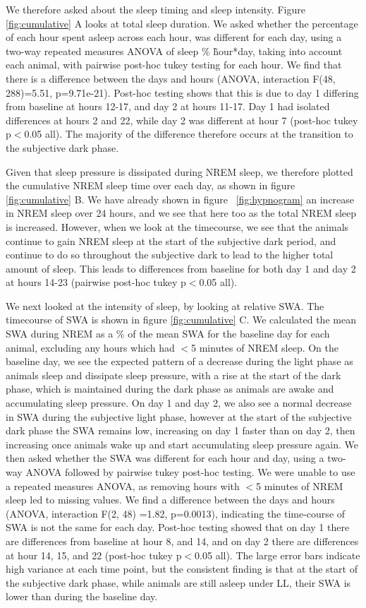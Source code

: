 We therefore asked about the sleep timing and sleep intensity. 
Figure \ref{fig:cumulative} A looks at total sleep duration.
We asked whether the percentage of each hour spent asleep across each hour,
was different for each day, using a two-way repeated measures ANOVA of sleep
\% \~hour*day, taking into account each animal, with pairwise post-hoc tukey
testing for each hour.
We find that there is a difference between the days and hours (ANOVA,
interaction F(48, 288)=5.51, p=9.71e-21).
Post-hoc testing shows that this is due to day 1 differing from baseline at
hours 12-17, and day 2 at hours 11-17.
Day 1 had isolated differences at hours 2 and 22, while day 2 was
different at hour 7 (post-hoc tukey p$<$0.05 all).
The majority of the difference therefore occurs at the transition to the
subjective dark phase.

Given that sleep pressure is dissipated during NREM sleep, we therefore
plotted the cumulative NREM sleep time over each day, as shown in figure
\ref{fig:cumulative} B.
We have already shown in figure ~\ref{fig:hypnogram} an increase in NREM sleep
over 24 hours, and we see that here too as the total NREM sleep is
increased.
However, when we look at the timecourse, we see that the animals continue to
gain NREM sleep at the start of the subjective dark period, and continue to
do so throughout the subjective dark to lead to the higher total amount of
sleep.
This leads to differences from baseline for both day 1 and day 2 at hours
14-23 (pairwise post-hoc tukey p$<$0.05 all).

We next looked at the intensity of sleep, by looking at relative SWA.
The timecourse of SWA is shown in figure \ref{fig:cumulative} C.
We calculated the mean SWA during NREM as a \% of the mean SWA for the baseline
day for each animal, excluding any hours which had $<$5 minutes of NREM sleep.
On the baseline day, we see the expected pattern of a decrease during the
light phase as animals sleep and dissipate sleep pressure, with a rise at
the start of the dark phase, which is maintained during the dark phase as
animals are awake and accumulating sleep pressure.
On day 1 and day 2, we also see a normal decrease in SWA during the
subjective light phase, however at the start of the subjective dark phase the
SWA remains low, increasing on day 1 faster than on day 2, then increasing once
animals wake up and start accumulating sleep pressure again.
We then asked whether the SWA was different for each hour and day, using a
two-way ANOVA followed by pairwise tukey post-hoc testing.
We were unable to use a repeated measures ANOVA, as removing hours with $<$5
minutes of NREM sleep led to missing values.
We find a difference between the days and hours (ANOVA, interaction F(2, 48)
=1.82, p=0.0013), indicating the time-course of SWA is not the same for each
day.
Post-hoc testing showed that on day 1 there are differences from baseline at
hour 8, and 14, and on day 2 there are differences at hour 14, 15, and 22
(post-hoc tukey p$<$0.05 all).
The large error bars indicate high variance at each time point, but the 
consistent finding is that at the start of the subjective dark phase,
while animals are still asleep under LL, their SWA is lower than during
the baseline day. 

